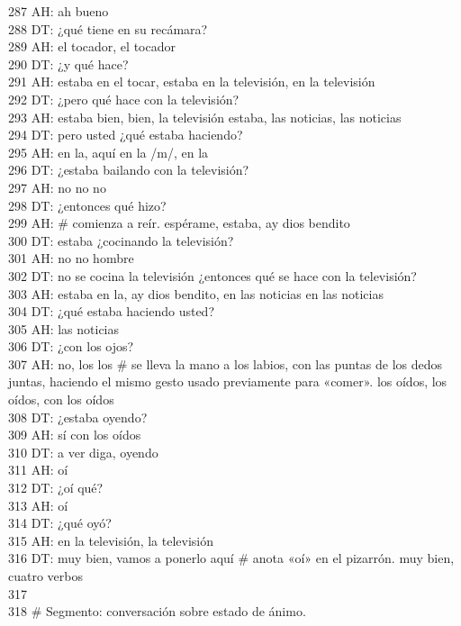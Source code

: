 287 AH: ah bueno\\
288 DT: ¿qué tiene en su recámara?\\
289 AH: el tocador, el tocador\\
290 DT: ¿y qué hace?\\
291 AH: estaba en el tocar, estaba en la televisión, en la televisión\\
292 DT: ¿pero qué hace con la televisión?\\
293 AH: estaba bien, bien, la televisión estaba, las noticias, las noticias\\
294 DT: pero usted ¿qué estaba haciendo?\\
295 AH: en la, aquí en la /m/, en la\\
296 DT: ¿estaba bailando con la televisión?\\
297 AH: no no no\\
298 DT: ¿entonces qué hizo?\\
299 AH: \# comienza a reír. espérame, estaba, ay dios bendito\\
300 DT: estaba ¿cocinando la televisión?\\
301 AH: no no hombre\\
302 DT: no se cocina la televisión ¿entonces qué se hace con la televisión?\\
303 AH: estaba en la, ay dios bendito, en las noticias en las noticias\\
304 DT: ¿qué estaba haciendo usted?\\
305 AH: las noticias\\
306 DT: ¿con los ojos?\\
307 AH: no, los los \# se lleva la mano a los labios, con las puntas de los dedos juntas, haciendo el mismo gesto usado previamente para «comer». los oídos, los oídos, con los oídos\\
308 DT: ¿estaba oyendo?\\
309 AH: sí con los oídos\\
310 DT: a ver diga, oyendo\\
311 AH: oí\\
312 DT: ¿oí qué?\\
313 AH: oí\\
314 DT: ¿qué oyó?\\
315 AH: en la televisión, la televisión\\
316 DT: muy bien, vamos a ponerlo aquí \# anota «oí» en el pizarrón. muy bien, cuatro verbos\\
317 \\
318 \# Segmento: conversación sobre estado de ánimo.\\

